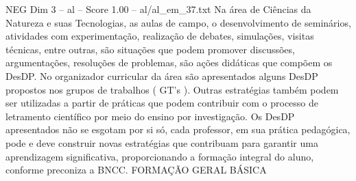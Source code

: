 \begin{textsample}{NEG Dim 3 – al – Score 1.00 – al/al\_em\_37.txt}
Na área de Ciências da Natureza e suas Tecnologias, as aulas de campo, o desenvolvimento de seminários, atividades com experimentação, realização de debates, simulações, visitas técnicas, entre outras, são situações que podem promover discussões, argumentações, resoluções de problemas, são ações didáticas que compõem os DesDP.
No organizador curricular da área são apresentados alguns DesDP propostos nos grupos de trabalhos ( GT’s ).
Outras estratégias também podem ser utilizadas a partir de práticas que podem contribuir com o processo de letramento científico por meio do ensino por investigação.
Os DesDP apresentados não se esgotam por si só, cada professor, em sua prática pedagógica, pode e deve construir novas estratégias que contribuam para garantir uma aprendizagem significativa, proporcionando a formação integral do aluno, conforme preconiza a BNCC.
FORMAÇÃO GERAL BÁSICA

\end{textsample}

